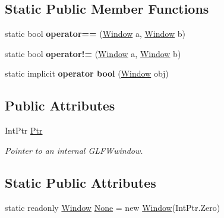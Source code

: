 \subsection*{Static Public Member Functions}
\begin{DoxyCompactItemize}
\item 
\mbox{\label{struct_glfw3_1_1_glfw_1_1_window_aa52188804106c3fcf29602ea3e7c2b44}} 
static bool {\bfseries operator==} (\mbox{\hyperlink{struct_glfw3_1_1_glfw_1_1_window}{Window}} a, \mbox{\hyperlink{struct_glfw3_1_1_glfw_1_1_window}{Window}} b)
\item 
\mbox{\label{struct_glfw3_1_1_glfw_1_1_window_aa404667211594e340b28f9f1dec3b894}} 
static bool {\bfseries operator!=} (\mbox{\hyperlink{struct_glfw3_1_1_glfw_1_1_window}{Window}} a, \mbox{\hyperlink{struct_glfw3_1_1_glfw_1_1_window}{Window}} b)
\item 
\mbox{\label{struct_glfw3_1_1_glfw_1_1_window_a5f2feaf18e8bc600e4c60aae0a65ef70}} 
static implicit {\bfseries operator bool} (\mbox{\hyperlink{struct_glfw3_1_1_glfw_1_1_window}{Window}} obj)
\end{DoxyCompactItemize}
\subsection*{Public Attributes}
\begin{DoxyCompactItemize}
\item 
Int\+Ptr \mbox{\hyperlink{struct_glfw3_1_1_glfw_1_1_window_a7430cab046e77307dd5c30f153b1d25e}{Ptr}}
\begin{DoxyCompactList}\small\item\em Pointer to an internal G\+L\+F\+Wwindow. \end{DoxyCompactList}\end{DoxyCompactItemize}
\subsection*{Static Public Attributes}
\begin{DoxyCompactItemize}
\item 
static readonly \mbox{\hyperlink{struct_glfw3_1_1_glfw_1_1_window}{Window}} \mbox{\hyperlink{struct_glfw3_1_1_glfw_1_1_window_adbd0a4231a59af9e5175f77c966e9ec8}{None}} = new \mbox{\hyperlink{struct_glfw3_1_1_glfw_1_1_window}{Window}}(Int\+Ptr.\+Zero)
\end{DoxyCompactItemize}


